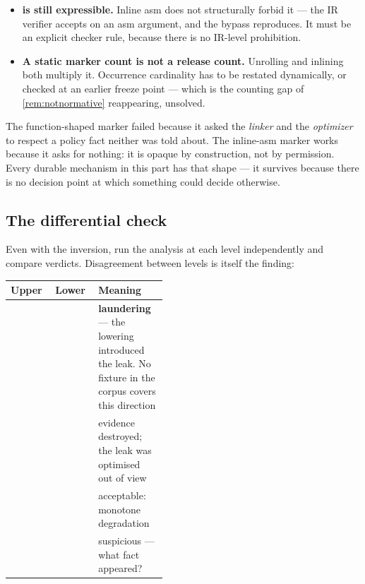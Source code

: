 \begin{itemize}[nosep,leftmargin=1.4em]
\item \textbf{ is still expressible.} Inline asm does not
      structurally forbid it --- the IR verifier accepts  on an
      asm argument, and the bypass reproduces. It must be an explicit checker
      rule, because there is no IR-level prohibition.
\item \textbf{A static marker count is not a release count.} Unrolling and
      inlining both multiply it. Occurrence cardinality has to be restated
      dynamically, or checked at an earlier freeze point --- which is the
      counting gap of \cref{rem:notnormative} reappearing, unsolved.
\end{itemize}

\begin{remark}
The function-shaped marker failed because it asked the \emph{linker} and the
\emph{optimizer} to respect a policy fact neither was told about. The inline-asm
marker works because it asks for nothing: it is opaque by construction, not by
permission. Every durable mechanism in this part has that shape --- it survives
because there is no decision point at which something could decide otherwise.
\end{remark}

\subsection{The differential check}

Even with the inversion, run the analysis at each level independently and compare
verdicts. Disagreement between levels is itself the finding:

\begin{center}
\begin{tabular}{@{}l l p{0.44\linewidth}@{}}
\toprule
Upper & Lower & Meaning \\
\midrule
\Verified{} & \Unsafe{}   & \textbf{laundering} --- the lowering introduced the leak.
                            No fixture in the corpus covers this direction \\
\Unsafe{}   & \Verified{} & evidence destroyed; the leak was optimised out of view \\
\Verified{} & \Unknown{}  & acceptable: monotone degradation \\
\Unknown{}  & \Verified{} & suspicious --- what fact appeared? \\
\bottomrule
\end{tabular}
\end{center}


